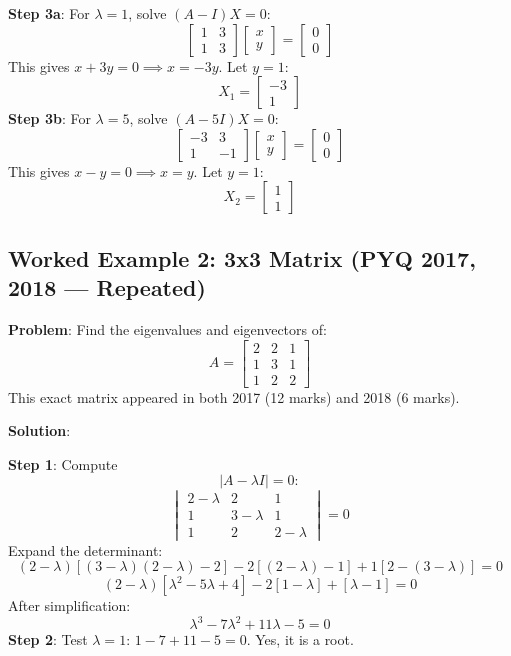 \documentclass[
]{article}
\begin{document}
\textbf{Step 3a}: For \(\lambda = 1\), solve \((A - I)X = 0\):
\[
\begin{bmatrix}
1 & 3 \\
1 & 3
\end{bmatrix} \begin{bmatrix} x \\ y \end{bmatrix} = \begin{bmatrix} 0 \\ 0 \end{bmatrix}
\]
This gives \(x + 3y = 0 \implies x = -3y\). Let \(y = 1\):
\[
X_1 =
\begin{bmatrix}
-3 \\
1
\end{bmatrix}
\]
\textbf{Step 3b}: For \(\lambda = 5\), solve \((A - 5I)X = 0\):
\[
\begin{bmatrix}
-3 & 3 \\
1 & -1
\end{bmatrix} \begin{bmatrix} x \\ y \end{bmatrix} = \begin{bmatrix} 0 \\ 0 \end{bmatrix}
\]
This gives \(x - y = 0 \implies x = y\). Let \(y = 1\):
\[
X_2 =
\begin{bmatrix}
1 \\
1
\end{bmatrix}
\]

\subsection{Worked Example 2: 3x3 Matrix (PYQ 2017, 2018 ---
Repeated)}\label{worked-example-2-3x3-matrix-pyq-2017-2018-repeated}

\textbf{Problem}: Find the eigenvalues and eigenvectors of:
\[
A =
\begin{bmatrix}
2 & 2 & 1 \\
1 & 3 & 1 \\
1 & 2 & 2
\end{bmatrix}
\]
This exact matrix appeared in both 2017 (12 marks) and 2018 (6 marks).

\textbf{Solution}:

\textbf{Step 1}: Compute
\[
\lvert A - \lambda I \rvert = 0:
\]
\[
\begin{vmatrix}
2-\lambda & 2 & 1 \\
1 & 3-\lambda & 1 \\
1 & 2 & 2-\lambda
\end{vmatrix} = 0
\]
Expand the determinant:
\[
(2-\lambda)[(3-\lambda)(2-\lambda) - 2] - 2[(2-\lambda) - 1] + 1[2 - (3-\lambda)] = 0
\]
\[
(2-\lambda)[\lambda^2 - 5\lambda + 4] - 2[1-\lambda] + [\lambda - 1] = 0
\]
After simplification:
\[
\lambda^3 - 7\lambda^2 + 11\lambda - 5 = 0
\]
\textbf{Step 2}: Test \(\lambda = 1\): \(1 - 7 + 11 - 5 = 0\). Yes, it
is a root.
\end{document}
